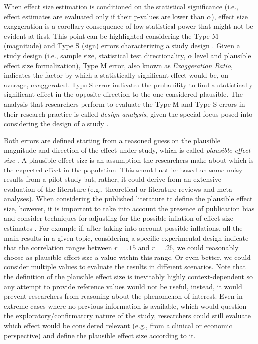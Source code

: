 \documentclass{article}\usepackage[]{graphicx}\usepackage[]{color}
\begin{document}
When effect size estimation is conditioned on the statistical significance (i.e., effect estimates are evaluated only if their p-values are lower than $\alpha$), effect size exaggeration is a corollary consequence of low statistical power that might not be evident at first. This point can be highlighted considering the Type M (magnitude) and Type S (sign) errors characterizing a study design \parencite{gelmanPowerCalculationsAssessing2014}. Given a study design (i.e., sample size, statistical test directionality, $\alpha$ level and plausible effect size formalization), Type M error, also known as \textit{Exaggeration Ratio}, indicates the factor by which a statistically significant effect would be, on average, exaggerated. Type S error indicates the probability to find a statistically significant effect in the opposite direction to the one considered plausible. The analysis that researchers perform to evaluate the Type M and Type S errors in their research practice is called \emph{design analysis}, given the special focus posed into considering the design of a study \parencite{altoeEnhancingStatisticalInference2020, gelmanPowerCalculationsAssessing2014}.

Both errors are defined starting from a reasoned guess on the plausible magnitude and direction of the effect under study, which is called \emph{plausible effect size} \parencite{gelmanPowerCalculationsAssessing2014}. A plausible effect size is an assumption the researchers make about which is the expected effect in the population. This should not be based on some noisy results from a pilot study but, rather, it could derive from an extensive evaluation of the literature (e.g., theoretical or literature reviews and meta-analyses).  When considering the published literature to define the plausible effect size, however, it is important to take into account the presence of publication bias \parencite{francoPublicationBiasSocial2014} and consider techniques for adjusting for the possible inflation of effect size estimates \parencite{andersonSampleSizePlanningMore2017}. For example if, after taking into account possible inflations, all the main results in a given topic, considering a specific experimental design indicate that the correlation ranges between $r = .15$ and $r =.25$, we could reasonably choose as plausible effect size a value within this range. Or even better, we could consider multiple values to evaluate the results in different scenarios. Note that the definition of the plausible effect size is inevitably highly context-dependent so any attempt to provide reference values would not be useful, instead, it would prevent researchers from reasoning about the phenomenon of interest. Even in extreme cases where no previous information is available, which would question the exploratory/confirmatory nature of the study, researchers could still evaluate which effect would be considered relevant (e.g., from a clinical or economic perspective) and define the plausible effect size according to it.
\end{document}
